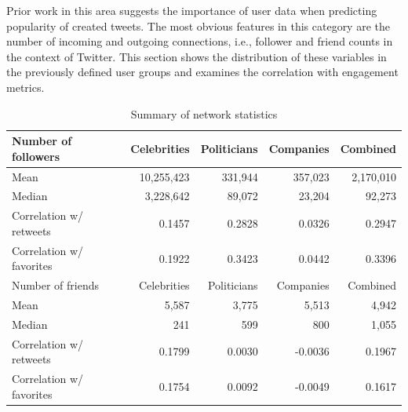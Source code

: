 Prior work in this area suggests the importance of user data when predicting
popularity of created tweets.
The most obvious features in this category are the number of incoming and outgoing
connections, i.e., follower and friend counts in the context of Twitter.
This section shows the distribution of these variables in the previously
defined user groups and examines the correlation with engagement metrics.

\begin{table}
\centering
\begin{tabular}{lrrrr}
\toprule
  Number of followers & Celebrities & Politicians & Companies & Combined\\
\midrule
  Mean & 10,255,423 & 331,944 & 357,023 & 2,170,010\\
  Median & 3,228,642 & 89,072 & 23,204 & 92,273\\
  Correlation w/ retweets & 0.1457 & 0.2828 & 0.0326 & 0.2947\\
  Correlation w/ favorites & 0.1922 & 0.3423 & 0.0442 & 0.3396\\
\midrule
  Number of friends & Celebrities & Politicians & Companies & Combined\\
\midrule
  Mean & 5,587 & 3,775 & 5,513 & 4,942\\
  Median & 241 & 599 & 800 & 1,055\\
  Correlation w/ retweets & 0.1799 & 0.0030 & -0.0036 & 0.1967\\
  Correlation w/ favorites & 0.1754 & 0.0092 & -0.0049 & 0.1617\\
\bottomrule
\end{tabular}
\caption{Summary of network statistics}
\label{tab:network_summary}
\end{table}

